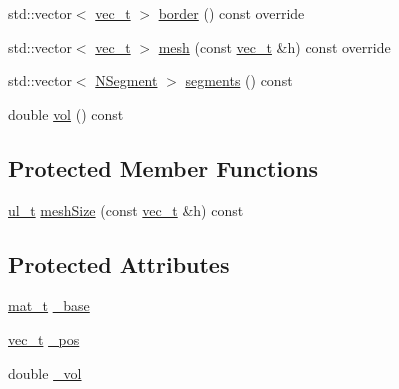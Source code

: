 \begin{DoxyCompactItemize}
\item 
std\+::vector$<$ \mbox{\hyperlink{group___n_algebra_ga0a2cfc67e738a3d73e4f12098c4c07f6}{vec\+\_\+t}} $>$ \mbox{\hyperlink{class_n_parallelepiped_a6cc531927e40a95b48923b56406206d3}{border}} () const override
\item 
std\+::vector$<$ \mbox{\hyperlink{group___n_algebra_ga0a2cfc67e738a3d73e4f12098c4c07f6}{vec\+\_\+t}} $>$ \mbox{\hyperlink{class_n_parallelepiped_a0f9ba9f6cab5d2c9472776e69f9aa78d}{mesh}} (const \mbox{\hyperlink{group___n_algebra_ga0a2cfc67e738a3d73e4f12098c4c07f6}{vec\+\_\+t}} \&h) const override
\item 
std\+::vector$<$ \mbox{\hyperlink{class_n_segment}{N\+Segment}} $>$ \mbox{\hyperlink{class_n_parallelepiped_a3440b48cfd7491ed747690a9f69dbbe4}{segments}} () const
\item 
double \mbox{\hyperlink{class_n_parallelepiped_a8529874bae044bdee3e0d805dae1887d}{vol}} () const
\end{DoxyCompactItemize}
\subsection*{Protected Member Functions}
\begin{DoxyCompactItemize}
\item 
\mbox{\hyperlink{typedef_8h_a1b140a2034db3f5dfe18a987745df43a}{ul\+\_\+t}} \mbox{\hyperlink{class_n_parallelepiped_a99696422faefb6e2f558c794017c95e4}{mesh\+Size}} (const \mbox{\hyperlink{group___n_algebra_ga0a2cfc67e738a3d73e4f12098c4c07f6}{vec\+\_\+t}} \&h) const
\end{DoxyCompactItemize}
\subsection*{Protected Attributes}
\begin{DoxyCompactItemize}
\item 
\mbox{\hyperlink{_n_p_matrix_8h_a44dfb60c1e03b44e98a332fb2ae71947}{mat\+\_\+t}} \mbox{\hyperlink{class_n_parallelepiped_a02542ae7d5e1d052412eb06a292e0e9d}{\+\_\+base}}
\item 
\mbox{\hyperlink{group___n_algebra_ga0a2cfc67e738a3d73e4f12098c4c07f6}{vec\+\_\+t}} \mbox{\hyperlink{class_n_parallelepiped_ae1cc22beb853095d8a110c641dd8e005}{\+\_\+pos}}
\item 
double \mbox{\hyperlink{class_n_parallelepiped_aabd33c4ffeff864ea342440c08d4702b}{\+\_\+vol}}
\end{DoxyCompactItemize}


